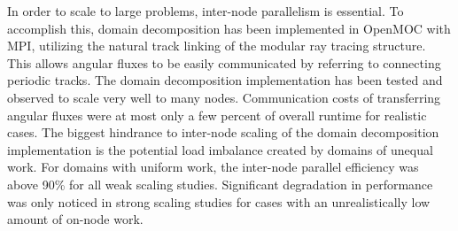 In order to scale to large problems, inter-node parallelism is essential. To accomplish this, domain decomposition has been implemented in OpenMOC with MPI, utilizing the natural track linking of the modular ray tracing structure. This allows angular fluxes to be easily communicated by referring to connecting periodic tracks. The domain decomposition implementation has been tested and observed to scale very well to many nodes. Communication costs of transferring angular fluxes were at most only a few percent of overall runtime for realistic cases. The biggest hindrance to inter-node scaling of the domain decomposition implementation is the potential load imbalance created by domains of unequal work. For domains with uniform work, the inter-node parallel efficiency was above 90\% for all weak scaling studies. Significant degradation in performance was only noticed in strong scaling studies for cases with an unrealistically low amount of on-node work.

